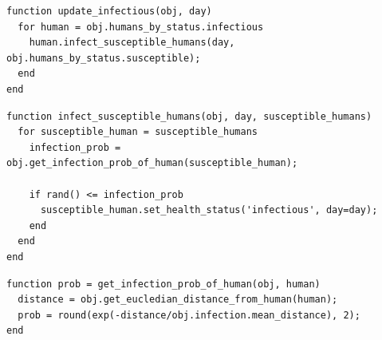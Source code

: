 \documentclass[a4paper]{article}
\newcommand{\code}{\texttt}
\begin{document}
\begin{lstlisting}[caption={Function for updating infectious humans, i.e., deciding which susceptible humans will every infectious humans infect, on a given day, where \code{obj} is \code{population}.}, label={code:update-infectious}]
function update_infectious(obj, day)
  for human = obj.humans_by_status.infectious
    human.infect_susceptible_humans(day, obj.humans_by_status.susceptible);
  end
end
\end{lstlisting}

\begin{lstlisting}[caption={Function for infecting susceptible humans by an infectious human on a given day, where \code{obj} is \code{human} - specifically, an instance of \code{human} whose health status is infectious.}, label={code:infect-susceptible-humans}]
function infect_susceptible_humans(obj, day, susceptible_humans)
  for susceptible_human = susceptible_humans                
    infection_prob = obj.get_infection_prob_of_human(susceptible_human);

    if rand() <= infection_prob
      susceptible_human.set_health_status('infectious', day=day);
    end
  end                
end
\end{lstlisting}

\begin{lstlisting}[caption={Function for getting the probability of infection between an infectious human and a susceptible human, where \code{obj} is \code{human} - specifically, an instance of \code{human} whose health status is infectious.}, label={code:get-infection-prob-of-human}]
function prob = get_infection_prob_of_human(obj, human)		
  distance = obj.get_eucledian_distance_from_human(human);
  prob = round(exp(-distance/obj.infection.mean_distance), 2);
end
\end{lstlisting}
\end{document}
